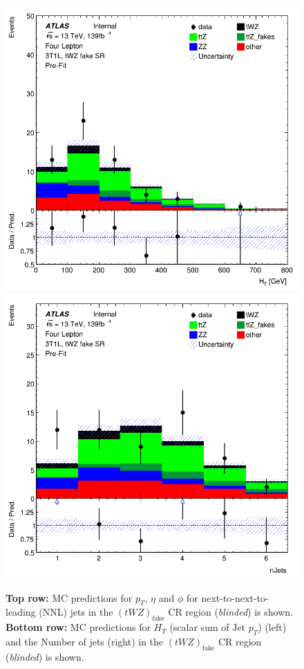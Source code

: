\begin{figure}[htbp]
    \includegraphics[width=.3\textwidth]{figures/PreFitPlots/lep4_tWZ_3T1L_HT.png}   \quad
    \includegraphics[width=.3\textwidth]{figures/PreFitPlots/lep4_tWZ_3T1L_Num_Jets.png}

    \caption{\textbf{Top row:} MC predictions for $p_{T}$, $\eta$ and $\phi$ for next-to-next-to-leading (NNL) jets in the $(tWZ)_{\text{fake}}$ CR region (\textit{blinded}) is shown. \textbf{Bottom row:} MC predictions for $H_{T}$ (scalar sum of Jet $p_{T}$) (left) and the Number of jets (right) in the $(tWZ)_{\text{fake}}$ CR region (\textit{blinded}) is shown.}
    \label{fig:4lep-tWZ-fake-CR-NNLjetPlots} 
\end{figure}



